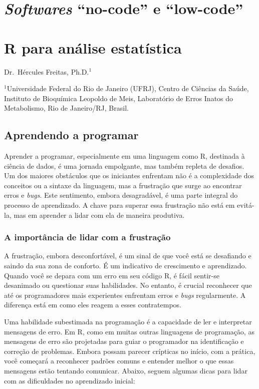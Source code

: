 \documentclass[
]{book}
\begin{document}
\section{\texorpdfstring{\emph{Softwares} ``no-code'' e ``low-code''}{Softwares ``no-code'' e ``low-code''}}\label{softwares-no-code-e-low-code}

\section{R para análise estatística}\label{r-para-anuxe1lise-estatuxedstica}

Dr.~Hércules Freitas, Ph.D.\(^1\)

\(^1\)Universidade Federal do Rio de Janeiro (UFRJ), Centro de Ciências da Saúde, Instituto de Bioquímica Leopoldo de Meis, Laboratório de Erros Inatos do Metabolismo, Rio de Janeiro/RJ, Brasil.

\subsection{Aprendendo a programar}\label{aprendendo-a-programar}

Aprender a programar, especialmente em uma linguagem como R, destinada à ciência de dados, é uma jornada empolgante, mas também repleta de desafios. Um dos maiores obstáculos que os iniciantes enfrentam não é a complexidade dos conceitos ou a sintaxe da linguagem, mas a frustração que surge ao encontrar erros e \emph{bugs}. Este sentimento, embora desagradável, é uma parte integral do processo de aprendizado. A chave para superar essa frustração não está em evitá-la, mas em aprender a lidar com ela de maneira produtiva.

\subsubsection{A importância de lidar com a frustração}\label{a-importuxe2ncia-de-lidar-com-a-frustrauxe7uxe3o}

A frustração, embora desconfortável, é um sinal de que você está se desafiando e saindo da sua zona de conforto. É um indicativo de crescimento e aprendizado. Quando você se depara com um erro em seu código R, é fácil sentir-se desanimado ou questionar suas habilidades. No entanto, é crucial reconhecer que até os programadores mais experientes enfrentam erros e \emph{bugs} regularmente. A diferença está em como eles reagem a esses contratempos.

Uma habilidade subestimada na programação é a capacidade de ler e interpretar mensagens de erro. Em R, como em muitas outras linguagens de programação, as mensagens de erro são projetadas para guiar o programador na identificação e correção de problemas. Embora possam parecer crípticas no início, com a prática, você começará a reconhecer padrões comuns e entender melhor o que essas mensagens estão tentando comunicar. Abaixo, seguem algumas dicas para lidar com as dificuldades no aprendizado inicial:
\end{document}
